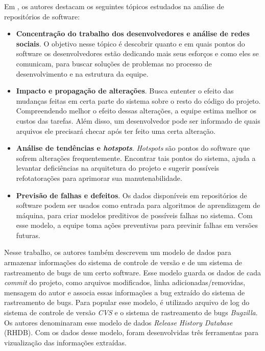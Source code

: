 \documentclass[a4paper, 12pt, twoside]{book}
\begin{document}
        Em \cite{DBLP:series/springer/DAmbrosGLP08}, os autores destacam os seguintes tópicos 
        estudados na análise de repositórios de software:
        \begin{itemize}
            \item \textbf{Concentração do trabalho dos desenvolvedores e análise de redes sociais}. 
            O objetivo nesse tópico é descobrir quanto e em quais pontos do software os desenvolvedores estão dedicando mais seus esforços e como eles se comunicam, para buscar soluções de problemas no processo de desenvolvimento e na estrutura da equipe.
            \item \textbf{Impacto e propagação de alterações}. 
            Busca ententer o efeito das mudanças feitas em
            certa parte do sistema sobre o resto do código do projeto. Compreendendo melhor o efeito
            dessas alterações, a equipe estima melhor os custos das tarefas. Além disso,
            um desenvolvedor pode ser informado de quais arquivos ele precisará checar após ter feito
            uma certa alteração.
            \item \textbf{Análise de tendências e \textit{hotspots}}. 
            \textit{Hotspots} são pontos do software
            que sofrem alterações frequentemente. Encontrar tais pontos do sistema, ajuda a 
            levantar deficiências na arquitetura do projeto e sugerir possíveis refotatorações para
            aprimorar sua manutenabilidade.
            \item \textbf{Previsão de falhas e defeitos}.
            Os dados disponíveis em repositórios de software
            podem ser usados como entrada para algoritmos de aprendizagem de máquina, para criar
            modelos preditivos de possíveis falhas no sistema. Com esse modelo, a equipe
            toma ações preventivas para previnir falhas em versões futuras.
        \end{itemize}

        Nesse trabalho, os autores também descrevem um modelo de dados para armazenar informações do
        sistema de controle de versão e de um sistema de rastreamento de bugs de um certo software.
        Esse modelo guarda os dados de cada \textit{commit} do projeto, como arquivos modificados, linha adicionadas/removidas, mensagem do autor e associa essas informações a bug extraído 
        do sistema de rastreamento de bugs. Para popular esse modelo, é utilizado arquivo de log
        do sistema de controle de versão \textit{CVS} e o sistema de rastreamento de bugs 
        \textit{Bugzilla}. Os autores denominaram esse modelo de dados \textit{Release History 
        Database} (RHDB). Com os dados desse modelo, foram desenvolvidas três ferramentas para 
        vizualização das informações extraídas.
\end{document}
